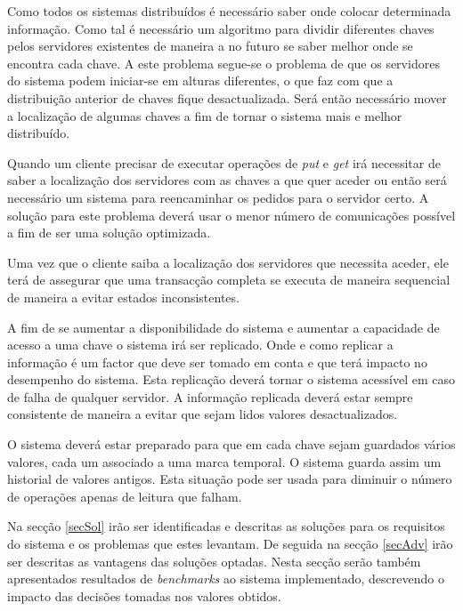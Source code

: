 \documentclass[times, 10pt,twocolumn]{article}
\begin{document}
Como todos os sistemas distribuídos é necessário saber onde colocar determinada informação. Como tal é necessário um algoritmo para dividir diferentes chaves pelos servidores existentes de maneira a no futuro se saber melhor onde se encontra cada chave. A este problema segue-se o problema de que os servidores do sistema podem iniciar-se em alturas diferentes, o que faz com que a distribuição anterior de chaves fique desactualizada. Será então necessário mover a localização de algumas chaves a fim de tornar o sistema mais e melhor distribuído.

Quando um cliente precisar de executar operações de \emph{put} e \emph{get} irá necessitar de saber a localização dos servidores com as chaves a que quer aceder ou então será necessário um sistema para reencaminhar os pedidos para o servidor certo. A solução para este problema deverá usar o menor número de comunicações possível a fim de ser uma solução optimizada.

Uma vez que o cliente saiba a localização dos servidores que necessita aceder, ele terá de assegurar que uma transacção completa se executa de maneira sequencial de maneira a evitar estados inconsistentes.

A fim de se aumentar a disponibilidade do sistema e aumentar a capacidade de acesso a uma chave o sistema irá ser replicado. Onde e como replicar a informação é um factor que deve ser tomado em conta e que terá impacto no desempenho do sistema. Esta replicação deverá tornar o sistema acessível em caso de falha de qualquer servidor. A informação replicada deverá estar sempre consistente de maneira a evitar que sejam lidos valores desactualizados.

O sistema deverá estar preparado para que em cada chave sejam guardados vários valores, cada um associado a uma marca temporal. O sistema guarda assim um historial de valores antigos. Esta situação pode ser usada para diminuir o número de operações apenas de leitura que falham.

Na secção \ref{secSol} irão ser identificadas e descritas as soluções para os requisitos do sistema e os problemas que estes levantam. De seguida na secção \ref{secAdv} irão ser descritas as vantagens das soluções optadas. Nesta secção serão também apresentados resultados de \emph{benchmarks} ao sistema implementado, descrevendo o impacto das decisões tomadas nos valores obtidos.

\end{document}

